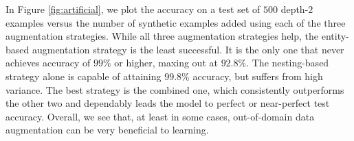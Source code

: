 \documentclass[11pt,letterpaper]{article}
\begin{document}
In Figure \ref{fig:artificial}, we plot the accuracy on a test set 
of $500$ depth-$2$ examples versus the number of synthetic examples added
using each of the three augmentation strategies.
While all three augmentation strategies help,
the entity-based augmentation strategy is the least successful.
It is the only one that never achieves accuracy of $99\%$ or higher,
maxing out at $92.8\%$.
The nesting-based strategy alone is capable of attaining
$99.8\%$ accuracy, but suffers from high variance.
The best strategy is the combined one, which 
consistently outperforms the other two and 
dependably leads the model to perfect or near-perfect test accuracy.
Overall, we see that, at least in some cases,
out-of-domain data augmentation can be very beneficial
to learning.

%
%
\end{document}
